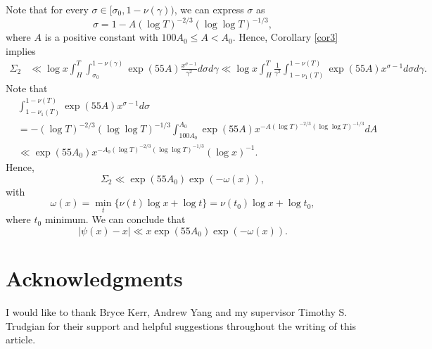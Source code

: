 \documentclass[reqno]{amsart}
\numberwithin{equation}{section}
\theoremstyle{remark}
\begin{document}
Note that for every $\sigma\in [\sigma_0,1-\nu(\gamma))$, we can express $\sigma$ as $$\sigma=1-A(\log T)^{-2/3}(\log\log T)^{-1/3},$$ where $A$ is a positive constant with $100A_0\le A<A_0$. Hence, Corollary \ref{cor3} implies
\begin{align*}
    \Sigma_2&\ll\log x \int_{H}^T\int_{\sigma_0}^{1-\nu(\gamma)} \exp (55 A) \frac{x^{\sigma-1}}{\gamma^2} d \sigma d \gamma\ll \log x\int_{H}^{T}\frac{1}{\gamma^2}\int_{1-\nu_1(T)}^{1-\nu(T)}\exp (55 A)x^{\sigma-1}d\sigma d\gamma.
\end{align*}
Note that
\begin{align*}
    &\int_{1-\nu_1(T)}^{1-\nu(T)}\exp (55 A)x^{\sigma-1}d\sigma\\
    &=-(\log T)^{-2/3}(\log\log T)^{-1/3}\int_{100A_0}^{A_0} \exp(55A)x^{-A(\log T)^{-2/3}(\log\log T)^{-1/3}}dA\\&\ll \exp(55A_0)x^{-A_0(\log T)^{-2/3}(\log\log T)^{-1/3}}(\log x)^{-1}.
\end{align*}
Hence, 
\begin{equation*}
    \Sigma_2\ll \exp(55A_0)\exp(-\omega(x)),
\end{equation*}
with
\[
\omega(x)=\min_t\{\nu(t)\log x+\log t\}=\nu(t_0)\log x+\log t_0,
\]
where $t_0$ minimum. We can conclude that
\begin{equation}
    |\psi(x)-x|\ll x\exp(55A_0)\exp(-\omega(x)).
\end{equation}
\section*{Acknowledgments}
I would like to thank Bryce Kerr, Andrew Yang and my supervisor Timothy S. Trudgian for their support and helpful suggestions throughout the writing of this article.
\printbibliography
\end{document}
